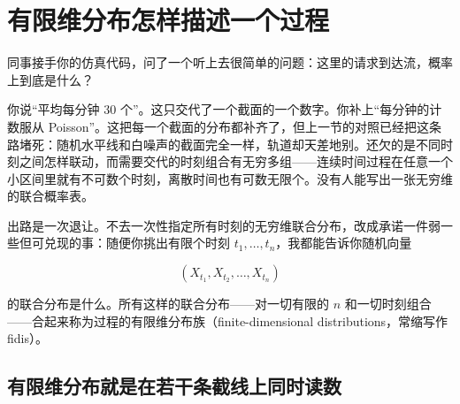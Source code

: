 \section{有限维分布怎样描述一个过程}
\label{sec:06-Random-Processes/01-Foundations/02}

同事接手你的仿真代码，问了一个听上去很简单的问题：这里的请求到达流，概率上到底是什么？

你说``平均每分钟 30 个''。这只交代了一个截面的一个数字。你补上``每分钟的计数服从 Poisson''。这把每一个截面的分布都补齐了，但上一节的对照已经把这条路堵死：随机水平线和白噪声的截面完全一样，轨道却天差地别。还欠的是不同时刻之间怎样联动，而需要交代的时刻组合有无穷多组——连续时间过程在任意一个小区间里就有不可数个时刻，离散时间也有可数无限个。没有人能写出一张无穷维的联合概率表。

出路是一次退让。不去一次性指定所有时刻的无穷维联合分布，改成承诺一件弱一些但可兑现的事：随便你挑出有限个时刻 \(t_1,\ldots,t_n\)，我都能告诉你随机向量

\[
(X_{t_1}, X_{t_2}, \ldots, X_{t_n})
\]

的联合分布是什么。所有这样的联合分布——对一切有限的 \(n\) 和一切时刻组合——合起来称为过程的有限维分布族（finite-dimensional distributions，常缩写作 fidis）。

\subsection{有限维分布就是在若干条截线上同时读数}

